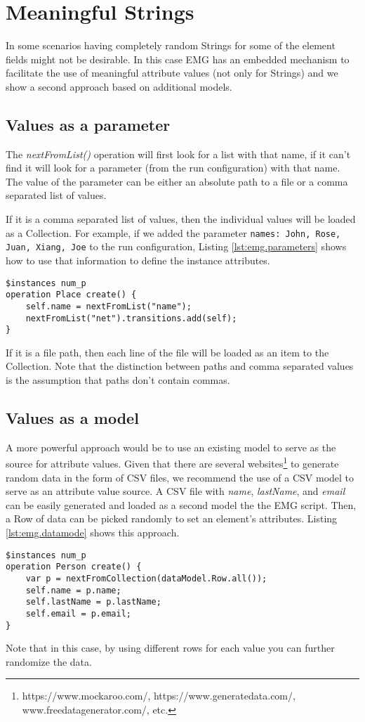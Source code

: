 \section{Meaningful Strings}
In some scenarios having completely random Strings for some of the element fields might not be desirable. In this case EMG has an embedded mechanism to facilitate the use of meaningful attribute values (not only for Strings) and we show a second approach based on additional models.

\subsection{Values as a parameter}
The \emph{nextFromList()} operation will first look for a list with that name, if it can't find it will look for a parameter (from the run configuration) with that name. The value of the parameter can be either an absolute path to a file or a comma separated list of values.

If it is a comma separated list of values, then the individual values will be loaded as a Collection. For example, if we added the parameter \texttt{names: John, Rose, Juan, Xiang, Joe} to the run configuration, Listing \ref{lst:emg.parameters} shows how to use that information to define the instance attributes.
\begin{lstlisting}[float=h, caption={EMG create operations}, label=lst:emg.parameters, language=EOL]
$instances num_p
operation Place create() {
    self.name = nextFromList("name");
    nextFromList("net").transitions.add(self);
}
\end{lstlisting}

If it is a file path, then each line of the file will be loaded as an item to the Collection. Note that the distinction between paths and comma separated values is the assumption that paths don't contain commas.

\subsection{Values as a model}
A more powerful approach would be to use an existing model to serve as the source for attribute values. Given that there are several websites\footnote{https://www.mockaroo.com/, https://www.generatedata.com/, www.freedatagenerator.com/, etc.} to generate random data in the form of CSV files, we recommend the use of a CSV model to serve as an attribute value source. A CSV file with \emph{name}, \emph{lastName}, and \emph{email} can be easily generated and loaded as a second model the the EMG script. Then, a Row of data can be picked randomly to set an element's attributes. Listing \ref{lst:emg.datamode} shows this approach.

\begin{lstlisting}[float=h, caption={EMG create operations}, label=lst:emg.datamode, language=EOL]
$instances num_p
operation Person create() {
    var p = nextFromCollection(dataModel.Row.all());
    self.name = p.name;
    self.lastName = p.lastName;
    self.email = p.email;
}
\end{lstlisting}

Note that in this case, by using different rows for each value you can further randomize the data.

